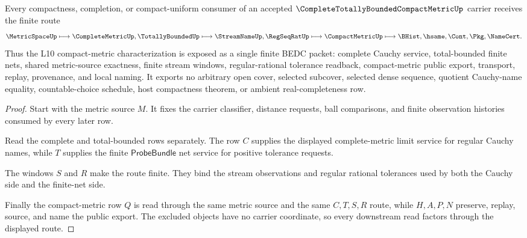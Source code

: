\begin{theorem}
\label{thm:complete-totally-bounded-compact-metric-uniform-handoff}
Every compactness, completion, or compact-uniform consumer of an accepted $\CompleteTotallyBoundedCompactMetricUp$ carrier receives the finite route
$$
\MetricSpaceUp
\longmapsto
\CompleteMetricUp,\TotallyBoundedUp
\longmapsto
\StreamNameUp,\RegSeqRatUp
\longmapsto
\CompactMetricUp
\longmapsto
\BHist,\hsame,\Cont,\Pkg,\NameCert .
$$
Thus the L10 compact-metric characterization is exposed as a single finite BEDC packet: complete Cauchy service, total-bounded finite nets, shared metric-source exactness, finite stream windows, regular-rational tolerance readback, compact-metric public export, transport, replay, provenance, and local naming. It exports no arbitrary open cover, selected subcover, selected dense sequence, quotient Cauchy-name equality, countable-choice schedule, host compactness theorem, or ambient real-completeness row.
\end{theorem}
\begin{proof}
Start with the metric source $M$. It fixes the carrier classifier, distance requests, ball comparisons, and finite observation histories consumed by every later row.

Read the complete and total-bounded rows separately. The row $C$ supplies the displayed complete-metric limit service for regular Cauchy names, while $T$ supplies the finite $\mathsf{ProbeBundle}$ net service for positive tolerance requests.

The windows $S$ and $R$ make the route finite. They bind the stream observations and regular rational tolerances used by both the Cauchy side and the finite-net side.

Finally the compact-metric row $Q$ is read through the same metric source and the same $C,T,S,R$ route, while $H,A,P,N$ preserve, replay, source, and name the public export. The excluded objects have no carrier coordinate, so every downstream read factors through the displayed route.
\end{proof}




